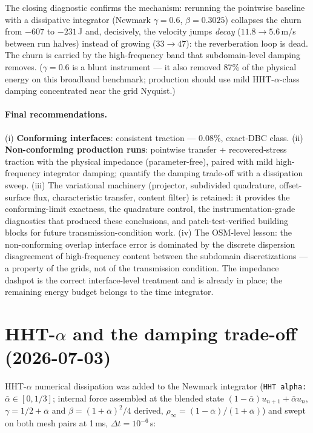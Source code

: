 \documentclass[11pt]{article}
\begin{document}
The closing diagnostic confirms the mechanism: rerunning the pointwise
baseline with a dissipative integrator (Newmark $\gamma = 0.6$,
$\beta = 0.3025$) collapses the churn from $-607$ to $-231$\,J and,
decisively, the velocity jumps \emph{decay} ($11.8 \to 5.6$\,m/s
between run halves) instead of growing ($33 \to 47$): the
reverberation loop is dead.  The churn is carried by the
high-frequency band that subdomain-level damping removes.  ($\gamma =
0.6$ is a blunt instrument --- it also removed 87\% of the physical
energy on this broadband benchmark; production should use mild
HHT-$\alpha$-class damping concentrated near the grid Nyquist.)

\paragraph{Final recommendations.}
(i) \textbf{Conforming interfaces}: consistent traction ---
0.08\%, exact-DBC class.
(ii) \textbf{Non-conforming production runs}: pointwise transfer +
recovered-stress traction with the physical impedance (parameter-free),
paired with mild high-frequency integrator damping; quantify the
damping trade-off with a dissipation sweep.
(iii) The variational machinery (projector, subdivided quadrature,
offset-surface flux, characteristic transfer, content filter) is
retained: it provides the conforming-limit exactness, the quadrature
control, the instrumentation-grade diagnostics that produced these
conclusions, and patch-test-verified building blocks for future
transmission-condition work.
(iv) The OSM-level lesson: the non-conforming overlap interface error
is dominated by the discrete dispersion disagreement of high-frequency
content between the subdomain discretizations --- a property of the
grids, not of the transmission condition.  The impedance dashpot is
the correct interface-level treatment and is already in place; the
remaining energy budget belongs to the time integrator.

\section{HHT-$\alpha$ and the damping trade-off (2026-07-03)}

HHT-$\alpha$ numerical dissipation was added to the Newmark integrator
(\texttt{HHT alpha:} $\bar\alpha \in [0, 1/3]$; internal force
assembled at the blended state $(1-\bar\alpha) u_{n+1} +
\bar\alpha u_n$, $\gamma = 1/2 + \bar\alpha$ and $\beta =
(1+\bar\alpha)^2/4$ derived, $\rho_\infty =
(1-\bar\alpha)/(1+\bar\alpha)$) and swept on both mesh pairs at
1\,ms, $\Delta t = 10^{-6}$\,s:
\end{document}
